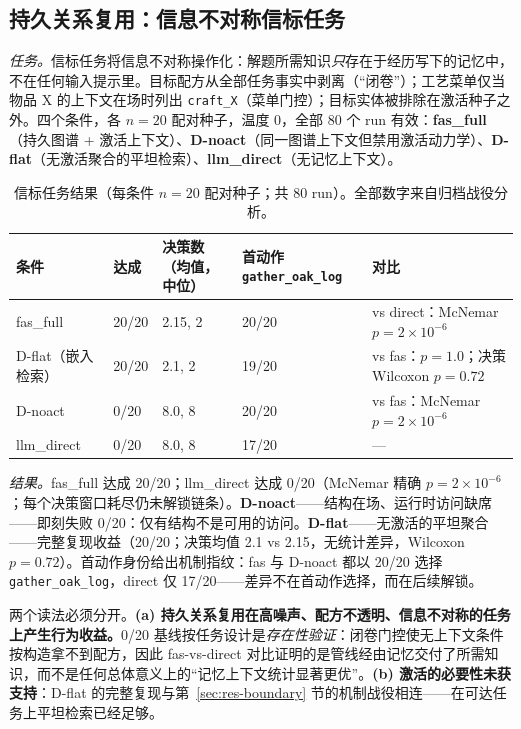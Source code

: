 \documentclass[10pt,a4paper]{ctexart}
\begin{document}
\subsection{持久关系复用：信息不对称信标任务}
\label{sec:res-reuse}

\emph{任务。}信标任务将信息不对称操作化：解题所需知识\emph{只}存在于经历写下的记忆中，不在任何输入提示里。目标配方从全部任务事实中剥离（“闭卷”）；工艺菜单仅当物品 X 的上下文在场时列出 \texttt{craft\_X}（菜单门控）；目标实体被排除在激活种子之外。四个条件，各 $n{=}20$ 配对种子，温度 0，全部 80 个 run 有效：\textbf{fas\_full}（持久图谱 + 激活上下文）、\textbf{D-noact}（同一图谱上下文但禁用激活动力学）、\textbf{D-flat}（无激活聚合的平坦检索）、\textbf{llm\_direct}（无记忆上下文）。

\begin{table}[t]
\centering\small
\caption{信标任务结果（每条件 $n{=}20$ 配对种子；共 80 run）。全部数字来自归档战役分析。}
\label{tab:beacon}
\begin{tabular}{L{2.6cm}L{2.2cm}L{3.4cm}L{3.4cm}L{2.6cm}}
\toprule
\textbf{条件} & \textbf{达成} & \textbf{决策数（均值，中位）} & \textbf{首动作 \texttt{gather\_oak\_log}} & \textbf{对比} \\
\midrule
fas\_full & 20/20 & 2.15, 2 & 20/20 & vs direct：McNemar $p{=}2\times10^{-6}$ \\
D-flat（嵌入检索） & 20/20 & 2.1, 2 & 19/20 & vs fas：$p{=}1.0$；决策 Wilcoxon $p{=}0.72$ \\
D-noact & 0/20 & 8.0, 8 & 20/20 & vs fas：McNemar $p{=}2\times10^{-6}$ \\
llm\_direct & 0/20 & 8.0, 8 & 17/20 & --- \\
\bottomrule
\end{tabular}
\end{table}

\emph{结果。}fas\_full 达成 20/20；llm\_direct 达成 0/20（McNemar 精确 $p{=}2\times10^{-6}$；每个决策窗口耗尽仍未解锁链条）。\textbf{D-noact}——结构在场、运行时访问缺席——即刻失败 0/20：仅有结构不是可用的访问。\textbf{D-flat}——无激活的平坦聚合——完整复现收益（20/20；决策均值 2.1 vs 2.15，无统计差异，Wilcoxon $p{=}0.72$）。首动作身份给出机制指纹：fas 与 D-noact 都以 20/20 选择 \texttt{gather\_oak\_log}，direct 仅 17/20——差异不在首动作选择，而在后续解锁。

两个读法必须分开。\textbf{(a) 持久关系复用在高噪声、配方不透明、信息不对称的任务上产生行为收益。}0/20 基线按任务设计是\emph{存在性验证}：闭卷门控使无上下文条件按构造拿不到配方，因此 fas-vs-direct 对比证明的是管线经由记忆交付了所需知识，而不是任何总体意义上的“记忆上下文统计显著更优”。\textbf{(b) 激活的必要性未获支持}：D-flat 的完整复现与第~\ref{sec:res-boundary} 节的机制战役相连——在可达任务上平坦检索已经足够。
\end{document}
